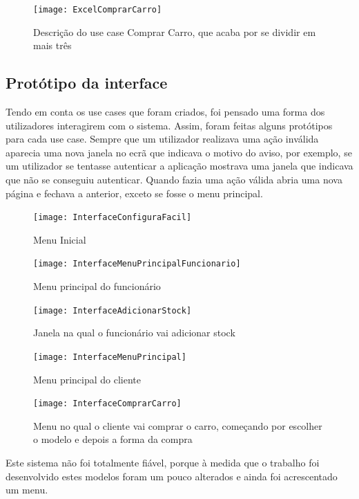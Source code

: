 \documentclass[10pt, a4paper]{article}
\begin{document}
\begin{figure}[!htb]
\centering
\texttt{[image: ExcelComprarCarro]}
\caption{Descrição do use case Comprar Carro, que acaba por se dividir em mais três}
\label{ECC}
\end{figure}


\newpage
\subsection{Protótipo da interface}
Tendo em conta os use cases que foram criados, foi pensado uma forma dos utilizadores interagirem com o sistema. Assim, foram feitas alguns protótipos para cada use case. Sempre que um utilizador realizava uma ação inválida aparecia uma nova janela no ecrã que indicava o motivo do aviso, por exemplo, se um utilizador se tentasse autenticar a aplicação mostrava uma janela que indicava que não se conseguiu autenticar. Quando fazia uma ação válida abria uma nova página e fechava a anterior, exceto se fosse o menu principal.

\begin{figure}[!htb]
\centering
\texttt{[image: InterfaceConfiguraFacil]}
\caption{Menu Inicial}
\label{Menu I}
\end{figure}

\begin{figure}[!htb]
\centering
\texttt{[image: InterfaceMenuPrincipalFuncionario]}
\caption{Menu principal do funcionário}
\label{Menu PF}
\end{figure}

\begin{figure}[!htb]
\centering
\texttt{[image: InterfaceAdicionarStock]}
\caption{Janela na qual o funcionário vai adicionar stock}
\label{Menu AS}
\end{figure}

\begin{figure}[!htb]
\centering
\texttt{[image: InterfaceMenuPrincipal]}
\caption{Menu principal do cliente}
\label{Menu CO}
\end{figure}

\begin{figure}[!htb]
\centering
\texttt{[image: InterfaceComprarCarro]}
\caption{Menu no qual o cliente vai comprar o carro, começando por escolher o modelo e depois a forma da compra}
\label{Menu CC}
\end{figure}

\newpage
Este sistema não foi totalmente fiável, porque à medida que o trabalho foi desenvolvido estes modelos foram um pouco alterados e ainda foi acrescentado um menu.
\end{document}
